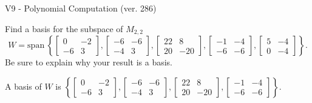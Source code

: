 \begin{exercise}
  \begin{exerciseTitle}V9 - Polynomial Computation (ver. 286)\end{exerciseTitle}
  \begin{exerciseStatement}
    Find a basis for the subspace of \(M_{2,2}\) 
\[W=\mathrm{span}\ \left\{\left[\begin{array}{cc}
0 & -2 \\
-6 & 3
\end{array}\right] , \left[\begin{array}{cc}
-6 & -6 \\
-4 & 3
\end{array}\right] , \left[\begin{array}{cc}
22 & 8 \\
20 & -20
\end{array}\right] , \left[\begin{array}{cc}
-1 & -4 \\
-6 & -6
\end{array}\right] , \left[\begin{array}{cc}
5 & -4 \\
0 & -4
\end{array}\right]\right\}.\]
 Be sure to explain why your result is a basis.


  \end{exerciseStatement}
  \begin{exerciseAnswer}
   A basis of \(W\) is  \(\left\{\left[\begin{array}{cc}
0 & -2 \\
-6 & 3
\end{array}\right] , \left[\begin{array}{cc}
-6 & -6 \\
-4 & 3
\end{array}\right] , \left[\begin{array}{cc}
22 & 8 \\
20 & -20
\end{array}\right] , \left[\begin{array}{cc}
-1 & -4 \\
-6 & -6
\end{array}\right]\right\}\).
  


  \end{exerciseAnswer}
\end{exercise}